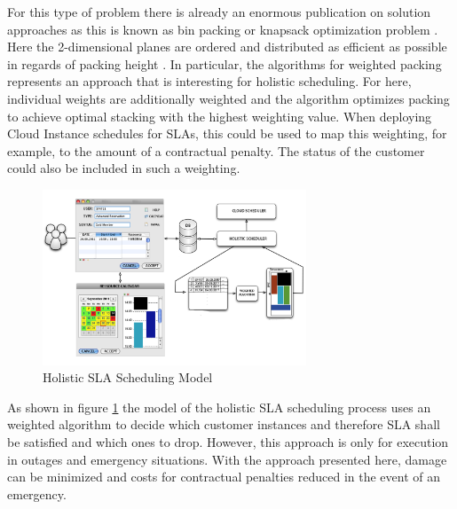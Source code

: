 For this type of problem there is already an enormous publication on solution approaches as this is known as bin packing or knapsack optimization problem  \cite{Korte2008}. Here the 2-dimensional planes are ordered and distributed as efficient as possible in regards of packing height  \cite{Wilson_1984}. In particular, the algorithms for weighted packing  \cite{10.1007/978-3-540-77918-6_18}  \cite{10.1007/978-3-642-13731-0_24}  \cite{Raidl:1999:MCP:335527.335530} represents an approach that is interesting for holistic scheduling. For here, individual weights are additionally weighted and the algorithm optimizes packing to achieve optimal stacking with the highest weighting value. When deploying Cloud Instance schedules for SLAs, this could be used to map this weighting, for example, to the amount of a contractual penalty. The status of the customer could also be included in such a weighting.

\begin{figure}[ht]
	\begin{center}
		\includegraphics[width=0.70\textwidth]{chapters/chapter5/fig/holo2}
	\end{center}
	\caption{Holistic SLA Scheduling Model}
	\label{fig:Holo2}
\end{figure}

As shown in figure \ref{fig:Holo2} the model of the holistic SLA scheduling process uses an weighted algorithm to decide which customer instances and therefore SLA shall be satisfied and which ones to drop. However, this approach is only for execution in outages and emergency situations. With the approach presented here, damage can be minimized and costs for contractual penalties reduced in the event of an emergency.
